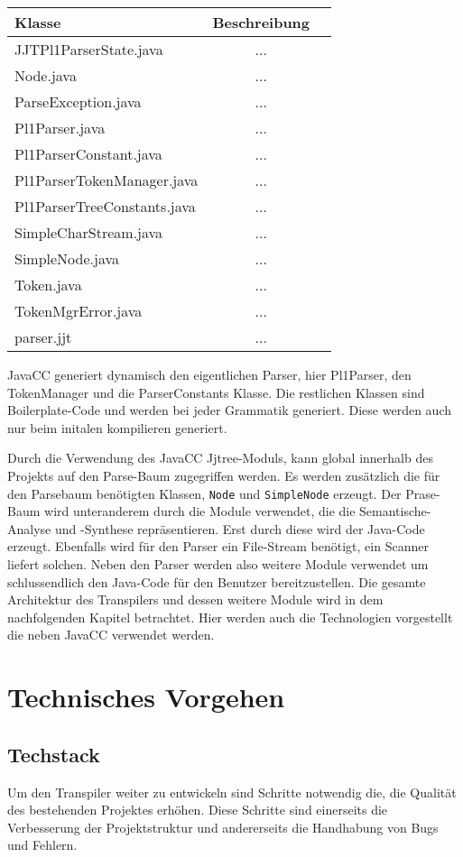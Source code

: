 \begin{tabular}[h]{l|c|r}
Klasse & Beschreibung \\
\hline
JJTPl1ParserState.java & ... \\
Node.java & ... \\
ParseException.java & ... \\
Pl1Parser.java & ... \\
Pl1ParserConstant.java & ... \\
Pl1ParserTokenManager.java & ... \\
Pl1ParserTreeConstants.java & ... \\
SimpleCharStream.java & ... \\
SimpleNode.java & ... \\
Token.java & ... \\
TokenMgrError.java & ... \\
parser.jjt & ... \\
\end{tabular}


JavaCC generiert dynamisch den eigentlichen Parser, hier Pl1Parser, den TokenManager und die ParserConstants Klasse. Die restlichen Klassen sind Boilerplate-Code und werden bei jeder Grammatik generiert. Diese werden auch nur beim initalen kompilieren generiert.

Durch die Verwendung des JavaCC Jjtree-Moduls, kann global innerhalb des Projekts auf den Parse-Baum zugegriffen werden. 
Es werden zusätzlich die für den Parsebaum benötigten Klassen, \verb+Node+ und \verb+SimpleNode+ erzeugt.
Der Prase-Baum wird unteranderem durch die Module verwendet, die die Semantische-Analyse und -Synthese repräsentieren.
Erst durch diese wird der Java-Code erzeugt.
Ebenfalls wird für den Parser ein File-Stream benötigt, ein Scanner liefert solchen.
Neben den Parser werden also weitere Module verwendet um schlussendlich den Java-Code für den Benutzer bereitzustellen.
Die gesamte Architektur des Transpilers und dessen weitere Module wird in dem nachfolgenden Kapitel betrachtet. 
Hier werden auch die Technologien vorgestellt die neben JavaCC verwendet werden. 

\section{Technisches Vorgehen}
\subsection{Techstack}
Um den Transpiler weiter zu entwickeln sind Schritte notwendig die, die Qualität des bestehenden Projektes erhöhen. Diese Schritte sind einerseits die Verbesserung der Projektstruktur und andererseits die Handhabung von Bugs und Fehlern.

